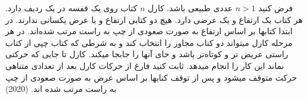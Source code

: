 فرض کنید $n > 1$ عددی طبیعی باشد. کارل $n$ کتاب روی یک قفسه در یک ردیف دارد. 
هر کتاب یک ارتفاع و یک عرضی دارد. 
هیچ دو کتابی ارتفاع و یا عرض یکسانی ندارند.
در ابتدا کتابها بر اساس ارتفاع به صورت صعودی از چپ به راست مرتب شده‌اند.
 در هر مرحله کارل میتواند دو کتاب مجاور را انتخاب کند و به شرطی که کتاب چپی از کتاب راستی عریض تر و کوتاه‌تر باشد
 و جای آنها را جابجا میکند.
 کارل تا جایی که حرکتی نماند این کار را انجام میدهد.
 ثابت کنید فارغ از حرکات کارل بعد از تعدادی متناهی حرکت متوقف میشود و پس از توقف کتابها بر اساس عرض به صورت صعودی از چپ به راست مرتب شده اند.
 (2020)
